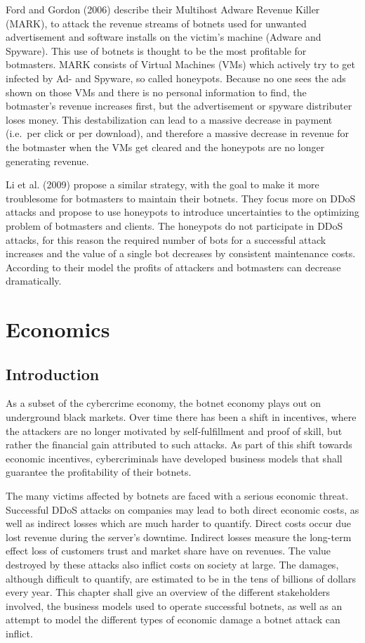 Ford and Gordon (2006) describe their Multihost Adware Revenue Killer (MARK), to attack the revenue streams of botnets used for unwanted advertisement and software installs on the victim's machine (Adware and Spyware).
This use of botnets is thought to be the most profitable for botmasters.
MARK consists of Virtual Machines (VMs) which actively try to get infected by Ad- and Spyware, so called honeypots.
Because no one sees the ads shown on those VMs and there is no personal information to find, the botmaster's revenue increases first, but the advertisement or spyware distributer loses money.
This destabilization can lead to a massive decrease in payment (i.e.\ per click or per download), and therefore a massive decrease in revenue for the botmaster when the VMs get cleared and the honeypots are no longer generating revenue.\cite{Ford07}

Li et al. (2009) propose a similar strategy, with the goal to make it more troublesome for botmasters to maintain their botnets.
They focus more on DDoS attacks and propose to use honeypots to introduce uncertainties to the optimizing problem of botmasters and clients.
The honeypots do not participate in DDoS attacks, for this reason the required number of bots for a successful attack increases and the value of a single bot decreases by consistent maintenance costs.
According to their model the profits of attackers and botmasters can decrease dramatically.\cite{Li09}

\section{Economics}
\subsection{Introduction}
As a subset of the cybercrime economy, the botnet economy plays out on underground black markets.
Over time there has been a shift in incentives, where the attackers are no longer motivated by self-fulfillment and proof of skill, but rather the financial gain attributed to such attacks.
As part of this shift towards economic incentives, cybercriminals have developed business models that shall guarantee the profitability of their botnets.\cite{Li09}

The many victims affected by botnets are faced with a serious economic threat.
Successful DDoS attacks on companies may lead to both direct economic costs, as well as indirect losses which are much harder to quantify.
Direct costs occur due lost revenue during the server's downtime.
Indirect losses measure the long-term effect loss of customers trust and market share have on revenues.
The value destroyed by these attacks also inflict costs on society at large.
The damages, although difficult to quantify, are estimated to be in the tens of billions of dollars every year.\cite{Asghari15}
This chapter shall give an overview of the different stakeholders involved, the business models used to operate successful botnets, as well as an attempt to model the different types of economic damage a botnet attack can inflict. 

